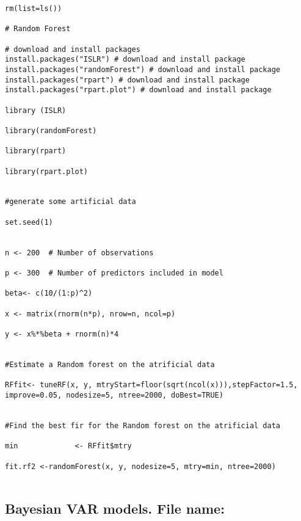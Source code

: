 \documentclass[12pt]{article}
\begin{document}
\begin{lstlisting}[title=\textbf{Random Forest}]
rm(list=ls())

# Random Forest

# download and install packages
install.packages("ISLR") # download and install package
install.packages("randomForest") # download and install package
install.packages("rpart") # download and install package
install.packages("rpart.plot") # download and install package

library (ISLR)

library(randomForest)

library(rpart)

library(rpart.plot)


#generate some artificial data

set.seed(1)


n <- 200  # Number of observations

p <- 300  # Number of predictors included in model

beta<- c(10/(1:p)^2)

x <- matrix(rnorm(n*p), nrow=n, ncol=p)

y <- x%*%beta + rnorm(n)*4


#Estimate a Random forest on the atrificial data

RFfit<- tuneRF(x, y, mtryStart=floor(sqrt(ncol(x))),stepFactor=1.5, improve=0.05, nodesize=5, ntree=2000, doBest=TRUE)


#Find the best fir for the Random forest on the atrificial data

min             <- RFfit$mtry

fit.rf2 <-randomForest(x, y, nodesize=5, mtry=min, ntree=2000)


\end{lstlisting}

\subsection{Bayesian VAR models. File name: \color{blue}{BVAR.R}}
\end{document}
